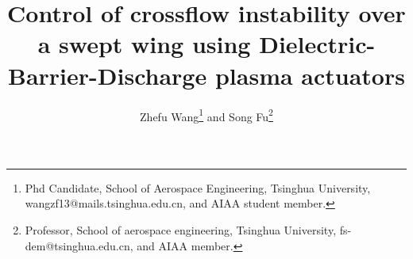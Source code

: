 \documentclass{AIAA}
\begin{document}
\title{Control of crossflow instability over a swept wing using Dielectric-Barrier-Discharge plasma actuators}

\author{Zhefu Wang\footnote{Phd Candidate, School of Aerospace Engineering, Tsinghua University, wangzf13@mails.tsinghua.edu.cn, and AIAA student member.} and Song Fu\footnote{Professor, School of aerospace engineering, Tsinghua University, fs-dem@tsinghua.edu.cn, and AIAA member.}}
\end{document}

